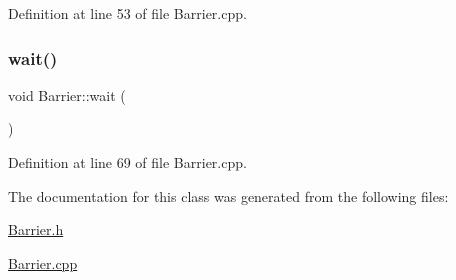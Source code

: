 Definition at line 53 of file Barrier.\+cpp.

\mbox{\label{class_barrier_a83a9d2e85e98b3d2081538bf0da29b60}} 
\subsubsection{\texorpdfstring{wait()}{wait()}}
{\footnotesize\ttfamily void Barrier\+::wait (\begin{DoxyParamCaption}{ }\end{DoxyParamCaption})}



Definition at line 69 of file Barrier.\+cpp.



The documentation for this class was generated from the following files\+:\begin{DoxyCompactItemize}
\item 
\hyperlink{_barrier_8h}{Barrier.\+h}\item 
\hyperlink{_barrier_8cpp}{Barrier.\+cpp}\end{DoxyCompactItemize}
